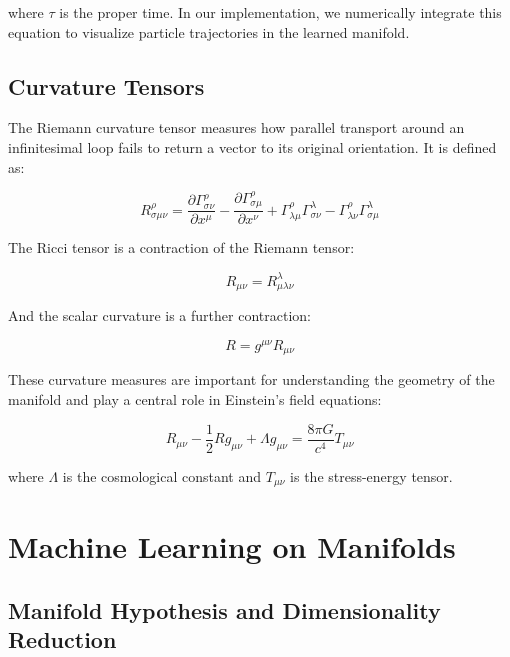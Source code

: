 \documentclass[11pt,a4paper]{article}
\newcommand{\pd}[2]{\frac{\partial #1}{\partial #2}}
\newcommand{\christoffel}[3]{\Gamma^{#1}_{#2 #3}}
\begin{document}
where $\tau$ is the proper time. In our implementation, we numerically integrate this equation to visualize particle trajectories in the learned manifold.

\subsection{Curvature Tensors}

The Riemann curvature tensor measures how parallel transport around an infinitesimal loop fails to return a vector to its original orientation. It is defined as:

\begin{equation}
    R^\rho_{\sigma\mu\nu} = \pd{\christoffel{\rho}{\sigma}{\nu}}{x^\mu} - \pd{\christoffel{\rho}{\sigma}{\mu}}{x^\nu} + \christoffel{\rho}{\lambda}{\mu}\christoffel{\lambda}{\sigma}{\nu} - \christoffel{\rho}{\lambda}{\nu}\christoffel{\lambda}{\sigma}{\mu}
\end{equation}

The Ricci tensor is a contraction of the Riemann tensor:

\begin{equation}
    R_{\mu\nu} = R^\lambda_{\mu\lambda\nu}
\end{equation}

And the scalar curvature is a further contraction:

\begin{equation}
    R = g^{\mu\nu} R_{\mu\nu}
\end{equation}

These curvature measures are important for understanding the geometry of the manifold and play a central role in Einstein's field equations:

\begin{equation}
    R_{\mu\nu} - \frac{1}{2}R g_{\mu\nu} + \Lambda g_{\mu\nu} = \frac{8\pi G}{c^4} T_{\mu\nu}
\end{equation}

where $\Lambda$ is the cosmological constant and $T_{\mu\nu}$ is the stress-energy tensor.

\section{Machine Learning on Manifolds}
\subsection{Manifold Hypothesis and Dimensionality Reduction}
\end{document}
